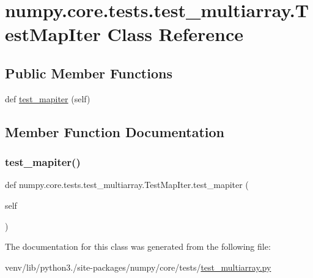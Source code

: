 \hypertarget{classnumpy_1_1core_1_1tests_1_1test__multiarray_1_1TestMapIter}{}\section{numpy.\+core.\+tests.\+test\+\_\+multiarray.\+Test\+Map\+Iter Class Reference}
\label{classnumpy_1_1core_1_1tests_1_1test__multiarray_1_1TestMapIter}
\subsection*{Public Member Functions}
\begin{DoxyCompactItemize}
\item 
def \hyperlink{classnumpy_1_1core_1_1tests_1_1test__multiarray_1_1TestMapIter_a2576d745a322a7c80260c74912065cd4}{test\+\_\+mapiter} (self)
\end{DoxyCompactItemize}


\subsection{Member Function Documentation}
\mbox{\label{classnumpy_1_1core_1_1tests_1_1test__multiarray_1_1TestMapIter_a2576d745a322a7c80260c74912065cd4}} 
\subsubsection{\texorpdfstring{test\+\_\+mapiter()}{test\_mapiter()}}
{\footnotesize\ttfamily def numpy.\+core.\+tests.\+test\+\_\+multiarray.\+Test\+Map\+Iter.\+test\+\_\+mapiter (\begin{DoxyParamCaption}\item[{}]{self }\end{DoxyParamCaption})}



The documentation for this class was generated from the following file\+:\begin{DoxyCompactItemize}
\item 
venv/lib/python3./site-\/packages/numpy/core/tests/\hyperlink{core_2tests_2test__multiarray_8py}{test\+\_\+multiarray.\+py}\end{DoxyCompactItemize}
